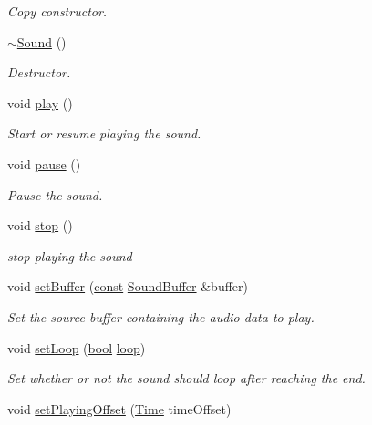 \begin{DoxyCompactItemize}
\begin{DoxyCompactList}\small\item\em Copy constructor. \end{DoxyCompactList}\item 
\hyperlink{classsf_1_1_sound_ad0792c35310eba2dffd8489c80fad076}{$\sim$\-Sound} ()
\begin{DoxyCompactList}\small\item\em Destructor. \end{DoxyCompactList}\item 
void \hyperlink{classsf_1_1_sound_a2953ffe632536e72e696fd880ced2532}{play} ()
\begin{DoxyCompactList}\small\item\em Start or resume playing the sound. \end{DoxyCompactList}\item 
void \hyperlink{classsf_1_1_sound_a5eeb25815bfa8cdc4a6cc000b7b19ad5}{pause} ()
\begin{DoxyCompactList}\small\item\em Pause the sound. \end{DoxyCompactList}\item 
void \hyperlink{classsf_1_1_sound_aa9c91c34f7c6d344d5ee9b997511f754}{stop} ()
\begin{DoxyCompactList}\small\item\em stop playing the sound \end{DoxyCompactList}\item 
void \hyperlink{classsf_1_1_sound_a8b395e9713d0efa48a18628c8ec1972e}{set\-Buffer} (\hyperlink{term__entry_8h_a57bd63ce7f9a353488880e3de6692d5a}{const} \hyperlink{classsf_1_1_sound_buffer}{Sound\-Buffer} \&buffer)
\begin{DoxyCompactList}\small\item\em Set the source buffer containing the audio data to play. \end{DoxyCompactList}\item 
void \hyperlink{classsf_1_1_sound_af23ab4f78f975bbabac031102321612b}{set\-Loop} (\hyperlink{term__entry_8h_a002004ba5d663f149f6c38064926abac}{bool} \hyperlink{_lapin_8cpp_ae75dc9a105e970734a903222f40b464c}{loop})
\begin{DoxyCompactList}\small\item\em Set whether or not the sound should loop after reaching the end. \end{DoxyCompactList}\item 
void \hyperlink{classsf_1_1_sound_ab905677846558042022dd6ab15cddff0}{set\-Playing\-Offset} (\hyperlink{classsf_1_1_time}{Time} time\-Offset)

\end{DoxyCompactItemize}
